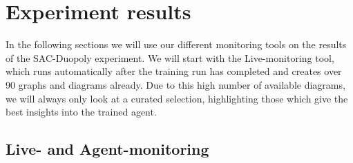 
\section{Experiment results}

In the following sections we will use our different monitoring tools on the results of the SAC-Duopoly experiment. We will start with the Live-monitoring tool, which runs automatically after the training run has completed and creates over 90 graphs and diagrams already. Due to this high number of available diagrams, we will always only look at a curated selection, highlighting those which give the best insights into the trained agent.

\subsection{Live- and Agent-monitoring}\label{subsec:LiveMonitoringResults}

